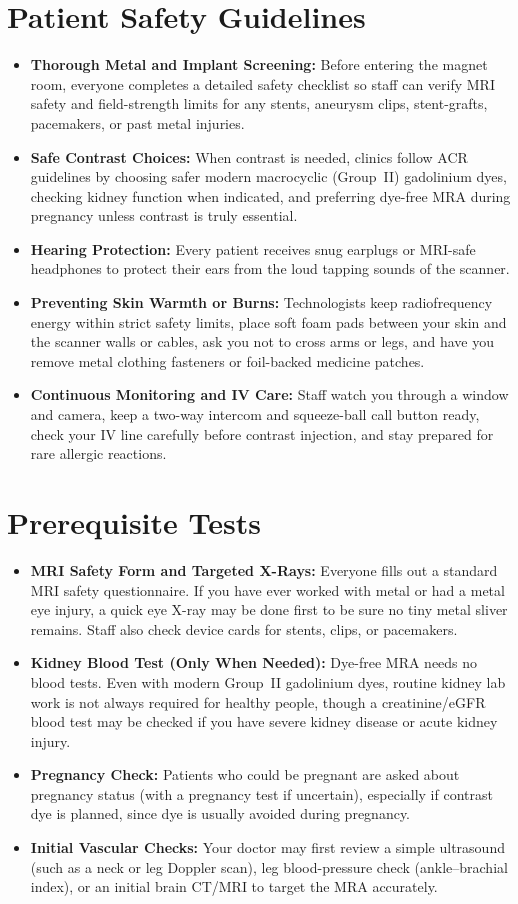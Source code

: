 \section{Patient Safety Guidelines}
\begin{itemize}
\item \textbf{Thorough Metal and Implant Screening:} Before entering the magnet room, everyone completes a detailed safety checklist so staff can verify MRI safety and field-strength limits for any stents, aneurysm clips, stent-grafts, pacemakers, or past metal injuries.
\item \textbf{Safe Contrast Choices:} When contrast is needed, clinics follow ACR guidelines by choosing safer modern macrocyclic (Group~II) gadolinium dyes, checking kidney function when indicated, and preferring dye-free MRA during pregnancy unless contrast is truly essential.
\item \textbf{Hearing Protection:} Every patient receives snug earplugs or MRI-safe headphones to protect their ears from the loud tapping sounds of the scanner.
\item \textbf{Preventing Skin Warmth or Burns:} Technologists keep radiofrequency energy within strict safety limits, place soft foam pads between your skin and the scanner walls or cables, ask you not to cross arms or legs, and have you remove metal clothing fasteners or foil-backed medicine patches.
\item \textbf{Continuous Monitoring and IV Care:} Staff watch you through a window and camera, keep a two-way intercom and squeeze-ball call button ready, check your IV line carefully before contrast injection, and stay prepared for rare allergic reactions.
\end{itemize}

\section{Prerequisite Tests}
\begin{itemize}
\item \textbf{MRI Safety Form and Targeted X-Rays:} Everyone fills out a standard MRI safety questionnaire. If you have ever worked with metal or had a metal eye injury, a quick eye X-ray may be done first to be sure no tiny metal sliver remains. Staff also check device cards for stents, clips, or pacemakers.
\item \textbf{Kidney Blood Test (Only When Needed):} Dye-free MRA needs no blood tests. Even with modern Group~II gadolinium dyes, routine kidney lab work is not always required for healthy people, though a creatinine/eGFR blood test may be checked if you have severe kidney disease or acute kidney injury.
\item \textbf{Pregnancy Check:} Patients who could be pregnant are asked about pregnancy status (with a pregnancy test if uncertain), especially if contrast dye is planned, since dye is usually avoided during pregnancy.
\item \textbf{Initial Vascular Checks:} Your doctor may first review a simple ultrasound (such as a neck or leg Doppler scan), leg blood-pressure check (ankle--brachial index), or an initial brain CT/MRI to target the MRA accurately.
\end{itemize}

